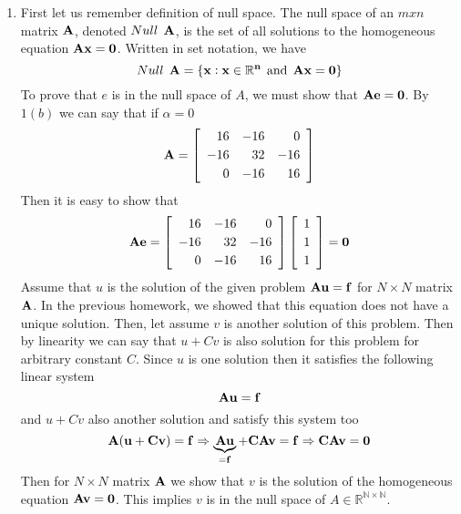 \begin{solution}
\begin{enumerate}
\item First let us remember definition of null space. The null space of an $mxn$ matrix $\bf{A}$, denoted $Null \:\:\bf{A}$, is
the set of all solutions to the homogeneous equation $\bf{A}x = 0$. Written in set
notation, we have
\[
Null \:\:\bf{A} = \{x : x \in \mathbb{R}^n \:\:\text{and} \:\: \bf{A}x = 0\}
\]
To prove that $e$ is in the null space of $A$, we must show that $\bf{A}e=0$. By $1(b)$ we can say that if $\alpha=0$
\[
\bf{A}=\left[\begin{array}{rrr}
              16 & -16&0 \\[0.25em]
               -16 & 32 &  -16  \\[0.25em]
                 0 &   -16  & 16 
               \end{array}\right]
\]
Then it is easy to show that  
\[
\bf{A}e= \left[\begin{array}{rrr}
              16 & -16 &  0 \\[0.25em]
               -16 & 32 &  -16  \\[0.25em]
                 0 &   -16  & 16 
               \end{array}\right]
          \left[\begin{array}{c} 1 \\[0.25em] 1 \\[0.25em] 1 \end{array}\right] 
       =0   
\] 
Assume that $u$ is the solution of the given problem $\bf{A}u=f$ for $N\times N$ matrix $\bf{A}$. In the previous homework, we showed that this equation does not have a unique solution. Then, let assume  $v$ is another solution of this problem. Then by linearity we can say that $u+Cv$ is also solution for this problem for arbitrary constant $C$. Since $u$ is one solution then it satisfies the following linear system
\[
\bf{A} u=f
\] 
and $u+Cv$ also another solution and satisfy this system too
\[
\bf{A}(u+Cv) = f \Rightarrow \underbrace{\bf{A}u}_{=f}+C\bf{A} v = f \Rightarrow  C\bf{A}v=0
\]
Then for $N \times N$ matrix $\bf{A}$ we show that $v$ is the solution of the homogeneous equation $\bf{A} v = 0$. This implies $v$ is in the null space of $A\in \mathbb{R^{N\times N}}$. 
\end{enumerate}
\end{solution}